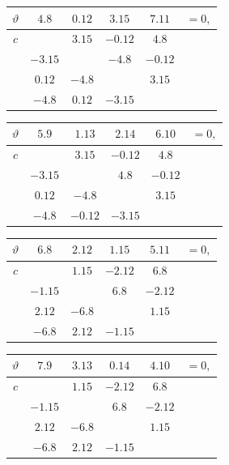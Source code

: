 \documentclass[11pt]{article}
\begin{document}
\smallskip
{\footnotesize
\begin{center}
\begin{tabular}{c|cccc|c}\hline
$\vartheta$ & $4.8$ & $0.12$ & $3.15$ & $7.11$ & $=0,$\\\hline
$c$ & & $3.15$ & $-0.12$ & $4.8$ & \\
& $-3.15$ & & $-4.8$ & $-0.12$ & \\
& $0.12$ & $-4.8$ & & $3.15$ & \\
& $-4.8$ & $0.12$ & $-3.15$ & & \\\hline
\end{tabular}
\hspace{0.8em}
\begin{tabular}{c|cccc|c}\hline
$\vartheta$ & $5.9$ & $1.13$ & $2.14$ & $6.10$ & $=0,$\\\hline
$c$ & & $3.15$ & $-0.12$ & $4.8$ & \\
& $-3.15$ & & $4.8$ & $-0.12$ & \\
& $0.12$ & $-4.8$ & & $3.15$ & \\
& $-4.8$ & $-0.12$ & $-3.15$ & & \\\hline
\end{tabular}
\end{center}

\smallskip
\begin{center}
\begin{tabular}{c|cccc|c}\hline
$\vartheta$ & $6.8$ & $2.12$ & $1.15$ & $5.11$ & $=0,$\\\hline
$c$ & & $1.15$ & $-2.12$ & $6.8$ & \\
& $-1.15$ & & $6.8$ & $-2.12$ & \\
& $2.12$ & $-6.8$ & & $1.15$ & \\
& $-6.8$ & $2.12$ & $-1.15$ & & \\\hline
\end{tabular}
\hspace{0.8em}
\begin{tabular}{c|cccc|c}\hline
$\vartheta$ & $7.9$ & $3.13$ & $0.14$ & $4.10$ & $=0,$\\\hline
$c$ & & $1.15$ & $-2.12$ & $6.8$ & \\
& $-1.15$ & & $6.8$ & $-2.12$ & \\
& $2.12$ & $-6.8$ & & $1.15$ & \\
& $-6.8$ & $2.12$ & $-1.15$ & & \\\hline
\end{tabular}
\end{center}

}
\end{document}
